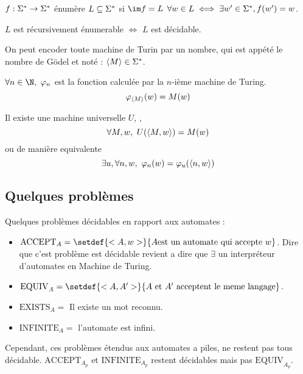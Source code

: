 \begin{definition}
	$f : \Sigma^{*} \to \Sigma^{*}$ énumère $L \subseteq \Sigma^{*}$ si $\im f = L$ \ie $\forall w \in L \iff \exists w' \in \Sigma^{*}, f (w') = w$.
\end{definition}

\begin{prop}
	$L$ est récursivement énumerable $\iff$ $L$ est décidable.
\end{prop}

On peut encoder toute machine de Turin par un nombre, qui est appété le nombre de Gödel et noté : $\left\langle M\right\rangle \in \Sigma^{*}$.

\begin{definition} \label{def:enum}
	$\forall n \in \N, \ \phi_n$ est la fonction calculée par la $n$-ième machine de Turing.
	$$\varphi_{\left\langle M\right\rangle} (w) = M (w)$$
\end{definition}


\begin{lemma}\label{lem:univ}
	Il existe une machine universelle $U$, \ie, $$\forall M,w, \  U (\left\langle M,w\right\rangle) = M (w)$$
	ou de manière equivalente
	$$\exists u, \forall n,w, \ \varphi_n(w) = \varphi_u(\left\langle n,w\right\rangle)$$
\end{lemma}

\subsection{Quelques problèmes}

Quelques problèmes décidables en rapport aux automates :

\begin{itemize}
	\item $\text{ACCEPT}_A = \setdef {<A,w>} {A \text {est un automate qui accepte } w}$.
	      Dire que c'est problème est décidable revient a dire que $\exists$ un interpréteur d'automates en Machine de Turing.
	\item $\text{EQUIV}_A = \setdef {<A,A'>} {A \text { et } A' \text{ acceptent le meme langage}}$.
	\item $\text{EXISTS}_A = $ Il existe un mot reconnu.
	\item $\text{INFINITE}_A = $ l'automate est infini.
\end{itemize}

Cependant, ces problèmes étendus aux automates a piles, ne restent pas tous décidable.
$\text{ACCEPT}_{A_p}$ et $\text{INFINITE}_{A_p}$ restent décidables mais pas $\text{EQUIV}_{A_p}$.

